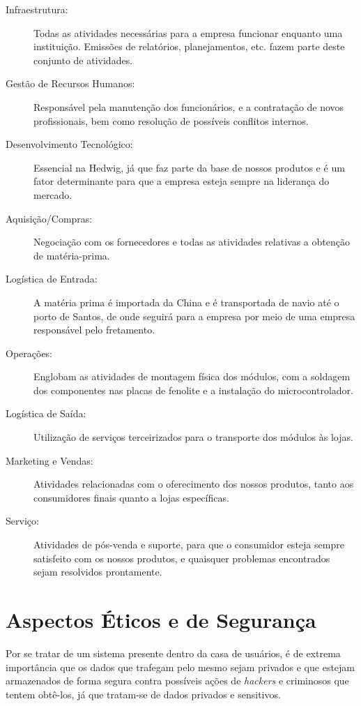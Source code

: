 \begin{description}
    \item[Infraestrutura:]Todas as atividades necessárias para a empresa funcionar enquanto uma instituição. Emissões de relatórios, planejamentos, etc. fazem parte deste conjunto de atividades.

    \item[Gestão de Recursos Humanos:]Responsável pela manutenção dos funcionários, e a contratação de novos profissionais, bem como resolução de possíveis conflitos internos.

    \item[Desenvolvimento Tecnológico:]Essencial na Hedwig, já que faz parte da base de nossos produtos e é um fator determinante para que a empresa esteja sempre na liderança do mercado.

    \item[Aquisição/Compras:]Negociação com os fornecedores e todas as atividades relativas a obtenção de matéria-prima.

    \item[Logística de Entrada:]A matéria prima é importada da China e é transportada de navio até o porto de Santos, de onde seguirá para a empresa por meio de uma empresa responsável pelo fretamento.

    \item[Operações:]Englobam as atividades de montagem física dos módulos, com a soldagem dos componentes nas placas de fenolite e a instalação do microcontrolador.

    \item[Logística de Saída:]Utilização de serviços terceirizados para o transporte dos módulos às lojas.

    \item[Marketing e Vendas:]Atividades relacionadas com o oferecimento dos nossos produtos, tanto aos consumidores finais quanto a lojas específicas.

    \item[Serviço:]Atividades de pós-venda e suporte, para que o consumidor esteja sempre satisfeito com os nossos produtos, e quaisquer problemas encontrados sejam resolvidos prontamente.
\end{description}

\section{Aspectos Éticos e de Segurança}

Por se tratar de um sistema presente dentro da casa de usuários, é de extrema importância que os dados que trafegam pelo mesmo sejam privados e que estejam armazenados de forma segura contra possíveis ações de \textit{hackers} e criminosos que tentem obtê-los, já que tratam-se de dados privados e sensitivos.

